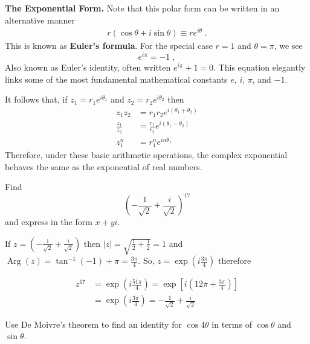 \textbf{The Exponential Form.} Note that this polar form can be written in an alternative manner
\begin{align}
r\left(\cos \theta +i\sin \theta \right)\equiv r{e}^{i\theta } \;. 
\end{align}
This is known as \textbf{Euler’s formula}. For the special case $r=1$ and $\theta =\pi $, we see
\[
{e}^{i\pi }=-1 \; ,
\]
Also known as Euler’s identity, often written ${e}^{i\pi }+1=0$. This equation elegantly links some of the most fundamental mathematical constants $e$, $i$, $\pi$, and $-1$. 

It follows that, if ${z}_{1}={r}_{1}{e}^{i{\theta }_{1}}$ and ${z}_{2}={r}_{2}{e}^{i{\theta }_{2}}$ then
\begin{align*}
{z}_{1}{z}_{2} & ={r}_{1}{r}_{2}{e}^{i\left({\theta }_{1}+{\theta }_{2}\right)}
\\[4pt]
\frac{{z}_{1}}{{z}_{2}} &= \frac{{r}_{1}}{{r}_{2}}{e}^{i\left({\theta }_{1}-{\theta }_{2}\right)}
\\[4pt]
{z}_{1}^{n} &={r}_{1}^{n}{e}^{in{\theta }_{1}}
\end{align*}
Therefore, under these basic arithmetic operations, the complex exponential behaves the same as the exponential of real numbers.

\goodbreak
\begin{example}[DIY]
\label{ex:534}
Find
\[
{\left(-\frac{1}{\sqrt{2}}+\frac{i}{\sqrt{2}}\right)}^{17}
\]
and express in the form $x+yi$.
\end{example}
%
\begin{blanksol}
If $z=\left(-\frac{1}{\sqrt{2}}+\frac{i}{\sqrt{2}}\right)$ then $\left|z\right|=\sqrt{\frac{1}{2}+\frac{1}{2}}=1$ and $\operatorname{Arg}\left(z\right)={\tan }^{-1} (-1) + \pi =\frac{3\pi }{4}$. So, $z=\exp \left(i\frac{3\pi }{4}\right)$ therefore

\begin{align*}
{z}^{17}&=\exp \left(i\frac{51\pi }{4}\right) =\exp \left[i\left(12\pi +\frac{3\pi }{4}\right)\right]\\
&=\exp \left(i\frac{3\pi }{4}\right) =-\frac{1}{\sqrt{2}}+\frac{i}{\sqrt{2}}
\end{align*}
\end{blanksol}

\goodbreak
\begin{example}[Video]
\label{ex:535}
Use De Moivre’s theorem to find an identity for $\cos 4\theta $ in terms of $\cos \theta $ and $\sin \theta $.
\end{example}

